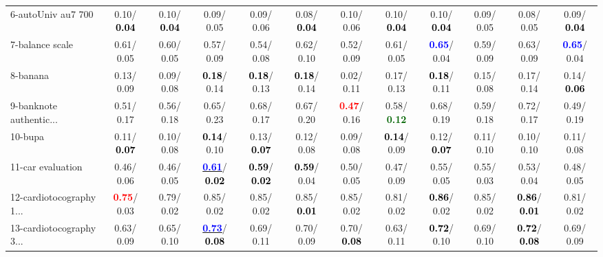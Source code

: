 \begin{table}[h]
\begin{center}
{\begin{tabular}{lc|c|c|c|c|c|c|c|c|c|c}
6-autoUniv au7 700 &   0.10/\textcolor{black}{\textbf{  0.04}} &   0.10/\textcolor{black}{\textbf{  0.04}} &   0.09/  0.05 &   0.09/  0.06 &   0.08/\textcolor{black}{\textbf{  0.04}} &   0.10/  0.06 &   0.10/\textcolor{black}{\textbf{  0.04}} &   0.10/\textcolor{black}{\textbf{  0.04}} &   0.09/  0.05 &   0.08/  0.05 &   0.09/\textcolor{black}{\textbf{  0.04}} \\
7-balance scale &   0.61/  0.05 &   0.60/  0.05 &   0.57/  0.09 &   0.54/  0.08 &   0.62/  0.10 &   0.52/  0.09 &   0.61/  0.05 & \textcolor{blue}{\textbf{  0.65}}/  0.04 &   0.59/  0.09 &   0.63/  0.09 & \textcolor{blue}{\textbf{  0.65}}/  0.04 \\ \hline
8-banana &   0.13/  0.09 &   0.09/  0.08 & \textcolor{black}{\textbf{  0.18}}/  0.14 & \textcolor{black}{\textbf{  0.18}}/  0.13 & \textcolor{black}{\textbf{  0.18}}/  0.14 &   0.02/  0.11 &   0.17/  0.13 & \textcolor{black}{\textbf{  0.18}}/  0.11 &   0.15/  0.08 &   0.17/  0.14 &   0.14/\textcolor{black}{\textbf{  0.06}} \\
9-banknote authentic... &   0.51/  0.17 &   0.56/  0.18 &   0.65/  0.23 &   0.68/  0.17 &   0.67/  0.20 & \textcolor{red}{\textbf{  0.47}}/  0.16 &   0.58/\textcolor{darkgreen}{\textbf{  0.12}} &   0.68/  0.19 &   0.59/  0.18 &   0.72/  0.17 &   0.49/  0.19 \\
10-bupa &   0.11/\textcolor{black}{\textbf{  0.07}} &   0.10/  0.08 & \textcolor{black}{\textbf{  0.14}}/  0.10 &   0.13/\textcolor{black}{\textbf{  0.07}} &   0.12/  0.08 &   0.09/  0.08 & \textcolor{black}{\textbf{  0.14}}/  0.09 &   0.12/\textcolor{black}{\textbf{  0.07}} &   0.11/  0.10 &   0.10/  0.10 &   0.11/  0.08 \\
11-car evaluation &   0.46/  0.06 &   0.46/  0.05 & \underline{\textcolor{blue}{\textbf{  0.61}}}/\textcolor{black}{\textbf{  0.02}} & \textcolor{black}{\textbf{  0.59}}/\textcolor{black}{\textbf{  0.02}} & \textcolor{black}{\textbf{  0.59}}/  0.04 &   0.50/  0.05 &   0.47/  0.09 &   0.55/  0.05 &   0.55/  0.03 &   0.53/  0.04 &   0.48/  0.05 \\
12-cardiotocography 1... & \textcolor{red}{\textbf{  0.75}}/  0.03 &   0.79/  0.02 &   0.85/  0.02 &   0.85/  0.02 &   0.85/\textcolor{black}{\textbf{  0.01}} &   0.85/  0.02 &   0.81/  0.02 & \textcolor{black}{\textbf{  0.86}}/  0.02 &   0.85/  0.02 & \textcolor{black}{\textbf{  0.86}}/\textcolor{black}{\textbf{  0.01}} &   0.81/  0.02 \\
13-cardiotocography 3... &   0.63/  0.09 &   0.65/  0.10 & \underline{\textcolor{blue}{\textbf{  0.73}}}/\textcolor{black}{\textbf{  0.08}} &   0.69/  0.11 &   0.70/  0.09 &   0.70/\textcolor{black}{\textbf{  0.08}} &   0.63/  0.11 & \textcolor{black}{\textbf{  0.72}}/  0.10 &   0.69/  0.10 & \textcolor{black}{\textbf{  0.72}}/\textcolor{black}{\textbf{  0.08}} &   0.69/  0.09 \\

\end{tabular}}
\end{center}
\end{table}

